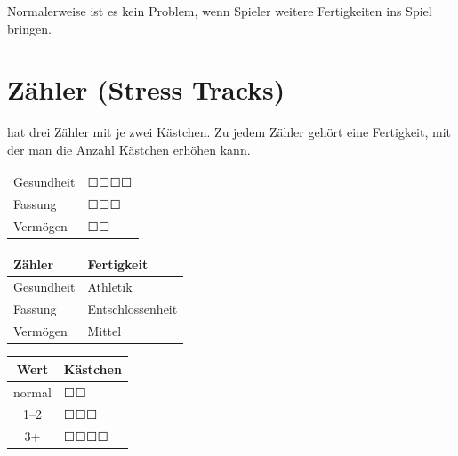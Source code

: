 \documentclass{tufte-handout}
\begin{document}
\bigskip
\noindent Normalerweise ist es kein Problem, wenn Spieler weitere
Fertigkeiten ins Spiel bringen.


\section{Zähler (Stress Tracks)}

 hat drei Zähler mit je zwei Kästchen. Zu
jedem Zähler gehört eine Fertigkeit, mit der man die Anzahl Kästchen
erhöhen kann.


\begin{margintable}
  \begin{tabular}{ll}
    Gesundheit & \(\Square \Square \Square \Square\) \\
    Fassung    & \(\Square \Square \Square\)         \\
    Vermögen   & \(\Square \Square\)                 \\
  \end{tabular}
\end{margintable}

\bigskip
\begin{minipage}[t]{0.5\textwidth}
  \begin{tabular}[t]{ll}
    Zähler     & Fertigkeit       \\
    \midrule
    Gesundheit & Athletik         \\
    Fassung    & Entschlossenheit \\
    Vermögen   & Mittel           \\
  \end{tabular}
\end{minipage}
\begin{minipage}[t]{0.5\textwidth}
  \hspace{2em}
  \begin{tabular}[t]{cl}
    Wert   & Kästchen                                    \\
    \midrule
    normal & \(\Square \Square\)                         \\
    1--2   & \(\Square \Square \Square\)                 \\
    3+     & \(\Square \Square \Square \Square\)         \\
  \end{tabular}
\end{minipage}
\end{document}
